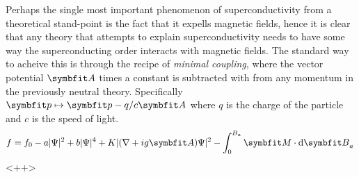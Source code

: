 Perhaps the single most important phenomenon of superconductivity from a theoretical stand-point is the fact that it expells
magnetic fields, hence it is clear that any theory that attempts to explain superconductivity needs to have some way the
superconducting order interacts with magnetic fields. The standard way to acheive this is through the recipe of
\emph{minimal coupling}, where the vector potential $\v{A}$ times a constant is subtracted with from any momentum
in the previously neutral theory. Specifically $\v{p}\mapsto \v{p}-q/c\v{A}$ where $q$ is the charge of the particle and
$c$ is the speed of light.
\begin{equation}
    \label{eq:statMech:gradTerms:GLequation}
    f = f_0 - a\abs{\Psi}^2 + b\abs{\Psi}^4 + K\abs{(\nabla+ig\v{A})\Psi}^2 - \int_0^{B_a}\v{M}\cdot\d{\v{B}_a}
\end{equation}<++>
